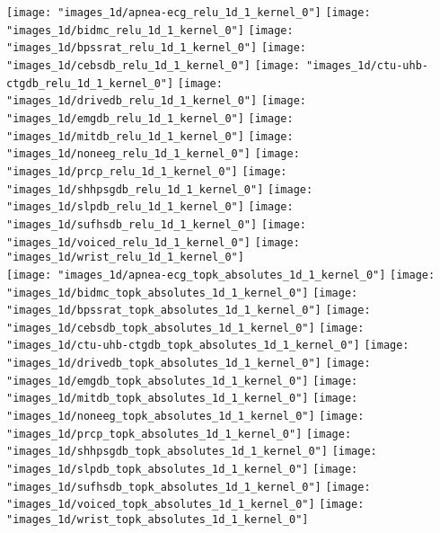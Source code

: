\documentclass[journal]{IEEEtran}
\begin{document}
\begin{figure*}[!t]
	\centering
	\texttt{[image: "images\_1d/apnea-ecg\_relu\_1d\_1\_kernel\_0"]}
	\texttt{[image: "images\_1d/bidmc\_relu\_1d\_1\_kernel\_0"]}
	\texttt{[image: "images\_1d/bpssrat\_relu\_1d\_1\_kernel\_0"]}
	\texttt{[image: "images\_1d/cebsdb\_relu\_1d\_1\_kernel\_0"]}
	\texttt{[image: "images\_1d/ctu-uhb-ctgdb\_relu\_1d\_1\_kernel\_0"]}
	\texttt{[image: "images\_1d/drivedb\_relu\_1d\_1\_kernel\_0"]}
	\texttt{[image: "images\_1d/emgdb\_relu\_1d\_1\_kernel\_0"]}
	\texttt{[image: "images\_1d/mitdb\_relu\_1d\_1\_kernel\_0"]}
	\texttt{[image: "images\_1d/noneeg\_relu\_1d\_1\_kernel\_0"]}
	\texttt{[image: "images\_1d/prcp\_relu\_1d\_1\_kernel\_0"]}
	\texttt{[image: "images\_1d/shhpsgdb\_relu\_1d\_1\_kernel\_0"]}
	\texttt{[image: "images\_1d/slpdb\_relu\_1d\_1\_kernel\_0"]}
	\texttt{[image: "images\_1d/sufhsdb\_relu\_1d\_1\_kernel\_0"]}
	\texttt{[image: "images\_1d/voiced\_relu\_1d\_1\_kernel\_0"]}
	\texttt{[image: "images\_1d/wrist\_relu\_1d\_1\_kernel\_0"]}
	\\
	\texttt{[image: "images\_1d/apnea-ecg\_topk\_absolutes\_1d\_1\_kernel\_0"]}
	\texttt{[image: "images\_1d/bidmc\_topk\_absolutes\_1d\_1\_kernel\_0"]}
	\texttt{[image: "images\_1d/bpssrat\_topk\_absolutes\_1d\_1\_kernel\_0"]}
	\texttt{[image: "images\_1d/cebsdb\_topk\_absolutes\_1d\_1\_kernel\_0"]}
	\texttt{[image: "images\_1d/ctu-uhb-ctgdb\_topk\_absolutes\_1d\_1\_kernel\_0"]}
	\texttt{[image: "images\_1d/drivedb\_topk\_absolutes\_1d\_1\_kernel\_0"]}
	\texttt{[image: "images\_1d/emgdb\_topk\_absolutes\_1d\_1\_kernel\_0"]}
	\texttt{[image: "images\_1d/mitdb\_topk\_absolutes\_1d\_1\_kernel\_0"]}
	\texttt{[image: "images\_1d/noneeg\_topk\_absolutes\_1d\_1\_kernel\_0"]}
	\texttt{[image: "images\_1d/prcp\_topk\_absolutes\_1d\_1\_kernel\_0"]}
	\texttt{[image: "images\_1d/shhpsgdb\_topk\_absolutes\_1d\_1\_kernel\_0"]}
	\texttt{[image: "images\_1d/slpdb\_topk\_absolutes\_1d\_1\_kernel\_0"]}
	\texttt{[image: "images\_1d/sufhsdb\_topk\_absolutes\_1d\_1\_kernel\_0"]}
	\texttt{[image: "images\_1d/voiced\_topk\_absolutes\_1d\_1\_kernel\_0"]}
	\texttt{[image: "images\_1d/wrist\_topk\_absolutes\_1d\_1\_kernel\_0"]}

\end{figure*}
\end{document}
